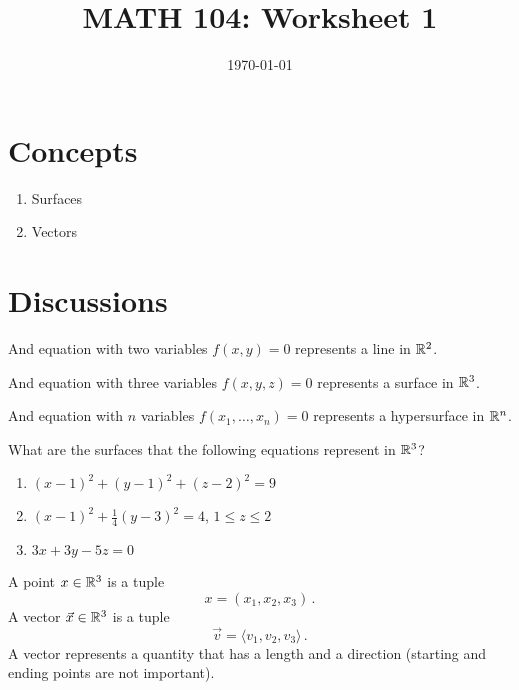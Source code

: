 \documentclass[12pt]{amsart}
\title{ MATH 104: Worksheet 1}
\author{}
\date{\today}
\begin{document}
\maketitle

\section{Concepts}

\begin{enumerate}
	\item Surfaces
	\item Vectors
\end{enumerate}

\section{Discussions}

\begin{definition}[Line in 2D]
	And equation with two variables $f(x,y) = 0$ represents a line in $\mathbb{R}^2$.
\end{definition}

\begin{definition}[Surface in 3D]
	And equation with three variables $f(x,y,z) = 0$ represents a surface in $\mathbb{R}^3$.
\end{definition}

\begin{definition}[Hypersurface]
	And equation with $n$ variables $f(x_1, \dots, x_n) = 0$ represents a hypersurface in $\mathbb{R}^n$.
\end{definition}

\begin{question}
	What are the surfaces that the following equations represent in $\mathbb{R}^3$?
	\begin{enumerate}
		\item $(x-1)^2 + (y-1)^2 + (z-2)^2 = 9$
		      \vspace{5cm}
		\item $(x-1)^2 + \frac{1}{4} (y -3)^2 = 4$, $1 \leq z \leq 2$
		      \vspace{5cm}
		\item $3x + 3y - 5z = 0$
		      \vspace{5cm}
	\end{enumerate}
\end{question}

\begin{definition}
	A point $x \in \mathbb{R}^3$ is a tuple
	\begin{equation*}
		x = ( x_1, x_2, x_3 ) \,.
	\end{equation*}
	A vector $\vec{x} \in \mathbb{R}^3$ is a tuple
	\begin{equation*}
		\vec{v} = \langle v_1, v_2, v_3 \rangle \,.
	\end{equation*}
	A vector represents a quantity that has a length and a direction (starting and ending points are not important).
\end{definition}
\end{document}
